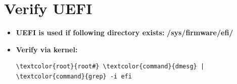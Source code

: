 \documentclass[10pt, a4paper, onecolumn, oneside, titlepage, openany]{book}
\begin{document}
\section{Verify UEFI}
\begin{itemize}
    \item \textbf{UEFI is used if following directory exists:}
\newline \textbf{\textcolor{dir}{/sys/firmware/efi/}}
    \item \textbf{Verify via kernel:}
\begin{Verbatim}[commandchars=\\\{\}]
\textcolor{root}{root#} \textcolor{command}{dmesg} | \textcolor{command}{grep} -i efi
\end{Verbatim}
\end{itemize}
\end{document}
